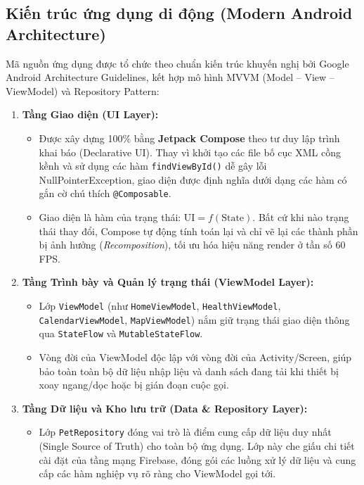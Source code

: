 \subsection{Kiến trúc ứng dụng di động (Modern Android Architecture)}
\label{subsec:kien_truc_frontend_mobile}

Mã nguồn ứng dụng được tổ chức theo chuẩn kiến trúc khuyến nghị bởi Google Android Architecture Guidelines, kết hợp mô hình MVVM (Model -- View -- ViewModel) và Repository Pattern:

\begin{enumerate}
    \item \textbf{Tầng Giao diện (UI Layer):}
    \begin{itemize}
        \item Được xây dựng 100\% bằng \textbf{Jetpack Compose} theo tư duy lập trình khai báo (Declarative UI). Thay vì khởi tạo các file bố cục XML cồng kềnh và sử dụng các hàm \texttt{findViewById()} dễ gây lỗi NullPointerException, giao diện được định nghĩa dưới dạng các hàm có gắn cờ chú thích \texttt{@Composable}.
        \item Giao diện là hàm của trạng thái: $\text{UI} = f(\text{State})$. Bất cứ khi nào trạng thái thay đổi, Compose tự động tính toán lại và chỉ vẽ lại các thành phần bị ảnh hưởng (\textit{Recomposition}), tối ưu hóa hiệu năng render ở tần số 60 FPS.
    \end{itemize}

    \item \textbf{Tầng Trình bày và Quản lý trạng thái (ViewModel Layer):}
    \begin{itemize}
        \item Lớp \texttt{ViewModel} (như \texttt{HomeViewModel}, \texttt{HealthViewModel}, \texttt{CalendarViewModel}, \texttt{MapViewModel}) nắm giữ trạng thái giao diện thông qua \texttt{StateFlow} và \texttt{MutableStateFlow}.
        \item Vòng đời của ViewModel độc lập với vòng đời của Activity/Screen, giúp bảo toàn toàn bộ dữ liệu nhập liệu và danh sách đang tải khi thiết bị xoay ngang/dọc hoặc bị gián đoạn cuộc gọi.
    \end{itemize}

    \item \textbf{Tầng Dữ liệu và Kho lưu trữ (Data \& Repository Layer):}
    \begin{itemize}
        \item Lớp \texttt{PetRepository} đóng vai trò là điểm cung cấp dữ liệu duy nhất (Single Source of Truth) cho toàn bộ ứng dụng. Lớp này che giấu chi tiết cài đặt của tầng mạng Firebase, đóng gói các luồng xử lý dữ liệu và cung cấp các hàm nghiệp vụ rõ ràng cho ViewModel gọi tới.
    \end{itemize}


\end{enumerate}
